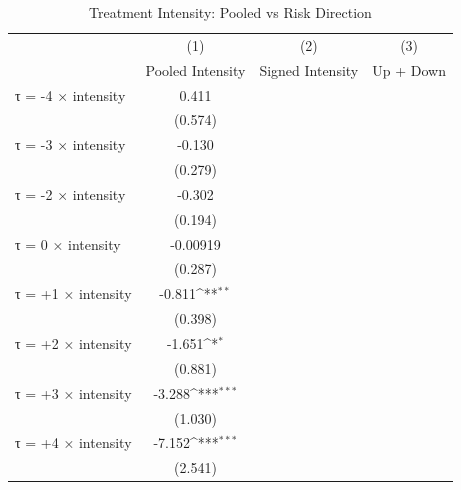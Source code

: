 \begin{table}[htbp]\centering
\def\sym#1{\ifmmode^{#1}\else\(^{#1}\)\fi}
\caption{Treatment Intensity: Pooled vs Risk Direction}
\begin{tabular}{l*{3}{c}}
\hline\hline
                    &\multicolumn{1}{c}{(1)}&\multicolumn{1}{c}{(2)}&\multicolumn{1}{c}{(3)}\\
                    &\multicolumn{1}{c}{Pooled Intensity}&\multicolumn{1}{c}{Signed Intensity}&\multicolumn{1}{c}{Up + Down}\\
\hline
τ = -4 × intensity  &       0.411         &                     &                     \\
                    &     (0.574)         &                     &                     \\
[1em]
τ = -3 × intensity  &      -0.130         &                     &                     \\
                    &     (0.279)         &                     &                     \\
[1em]
τ = -2 × intensity  &      -0.302         &                     &                     \\
                    &     (0.194)         &                     &                     \\
[1em]
τ = 0 × intensity   &    -0.00919         &                     &                     \\
                    &     (0.287)         &                     &                     \\
[1em]
τ = +1 × intensity  &      -0.811\sym{**} &                     &                     \\
                    &     (0.398)         &                     &                     \\
[1em]
τ = +2 × intensity  &      -1.651\sym{*}  &                     &                     \\
                    &     (0.881)         &                     &                     \\
[1em]
τ = +3 × intensity  &      -3.288\sym{***}&                     &                     \\
                    &     (1.030)         &                     &                     \\
[1em]
τ = +4 × intensity  &      -7.152\sym{***}&                     &                     \\
                    &     (2.541)         &                     &                     \\

\end{tabular}
\end{table}
